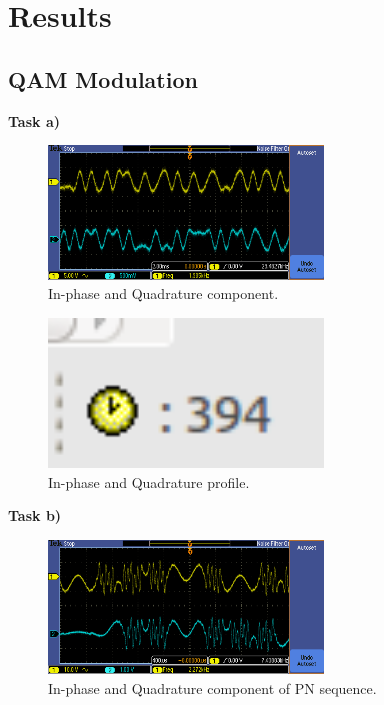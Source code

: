 \documentclass{article}
\begin{document}
\pagebreak

\pagebreak
\section{Results}

\subsection{QAM Modulation}

\textbf{Task a)}
\begin{figure}[h]
  \begin{center}
    \includegraphics[width=0.65\textwidth]{img/task_a_oscilloscope.png}
    \caption{In-phase and Quadrature component.}
  \end{center}
\end{figure}

\begin{figure}[h]
  \begin{center}
    \includegraphics[width=0.65\textwidth]{img/task_a_profile.png}
    \caption{In-phase and Quadrature profile.}
  \end{center}
\end{figure}

\pagebreak
\textbf{Task b)}

\begin{figure}[h]
  \begin{center}
    \includegraphics[width=0.65\textwidth]{img/task_b_oscilloscope.png}
    \caption{In-phase and Quadrature component of PN sequence.}
  \end{center}
\end{figure}
\end{document}
